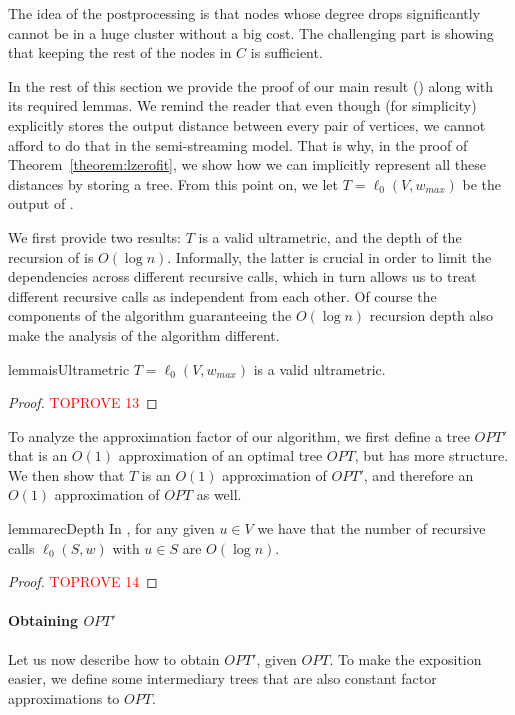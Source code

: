 \documentclass{article}
\begin{document}
The idea of the postprocessing is that nodes whose degree drops significantly cannot be in a huge cluster without a big cost.
The challenging part is showing that keeping the rest of the nodes in $C$ is sufficient.

In the rest of this section we provide the proof of our main result () along with its required lemmas.
We remind the reader that even though (for simplicity)  explicitly stores the output distance between every pair of vertices, we cannot afford to do that in the semi-streaming model.
That is why, in the proof of Theorem~\ref{theorem:lzerofit}, we show how we can implicitly represent all these distances by storing a tree.
From this point on, we let $T = \ell_0(V, w_{max})$ be the output of .

We first provide two results: $T$ is a valid ultrametric, and the depth of the recursion of  is $O(\log{n})$.
Informally, the latter is crucial in order to limit the dependencies across different recursive calls, which in turn allows us to treat different recursive calls as independent from each other.
Of course the components of the algorithm guaranteeing the $O(\log{n})$ recursion depth also make the analysis of the algorithm different.

\begin{restatable}{lemma}{isUltrametric}\label{lem:isUltrametric}
$T = \ell_0(V, w_{max})$ is a valid ultrametric.
\end{restatable}
\begin{proof}\textcolor{red}{TOPROVE 13}\end{proof}

To analyze the approximation factor of our algorithm, we first define a tree $OPT'$ that is an $O(1)$ approximation of an optimal tree $OPT$, but has more structure.
We then show that $T$ is an $O(1)$ approximation of $OPT'$, and therefore an $O(1)$ approximation of $OPT$ as well.

\begin{restatable}{lemma}{recDepth}\label{lem:recDepth}
In , for any given $u\in V$ we have that the number of recursive calls \textsc{$\ell_0(S, w)$} with $u\in S$ are $O(\log{n})$.
\end{restatable}
\begin{proof}\textcolor{red}{TOPROVE 14}\end{proof}

\paragraph*{Obtaining $OPT'$} Let us now describe how to obtain $OPT'$, given $OPT$.
To make the exposition easier, we define some intermediary trees that are also constant factor approximations to $OPT$.
\end{document}
